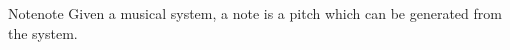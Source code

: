 \begin{definition}{Note}{note}
  Given a musical system, a note is a pitch which can be generated from the
  system.
\end{definition}
